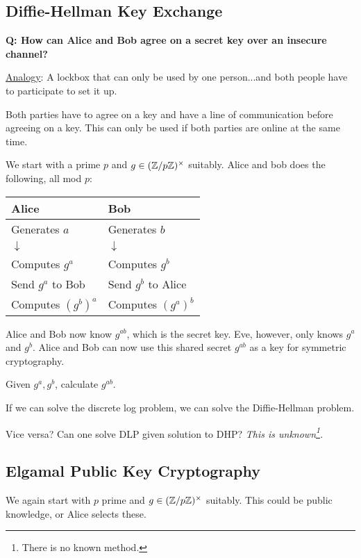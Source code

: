 \subsection{Diffie-Hellman Key Exchange}
\textbf{Q: How can Alice and Bob agree on a secret key over an insecure channel?}

\begin{example}
    \ul{Analogy}: A lockbox that can only be used by one person...and both people have to participate to set it up.
\end{example}

Both parties have to agree on a key and have a line of communication before agreeing on a key. This can only be used if both parties are online at the same time.

We start with a prime $p$ and $g\in(\mathbb Z/p\mathbb Z)^\times$ suitably. Alice and bob does the following, all mod $p$:
\begin{center}
    \begin{tabular}{ll}
        \toprule
        Alice              & Bob                 \\ \midrule
        Generates $a$      & Generates $b$       \\
        \quad $\downarrow$ & \quad $\downarrow$  \\
        Computes $g^a$     & Computes $g^b$      \\
        Send $g^a$ to Bob  & Send $g^b$ to Alice \\
        Computes $(g^b)^a$ & Computes $(g^a)^b$  \\
        \bottomrule
    \end{tabular}
\end{center}

Alice and Bob now know $g^{ab}$, which is the secret key. Eve, however, only knows $g^a$ and $g^b$. Alice and Bob can now use this shared secret $g^{ab}$ as a key for symmetric cryptography.

\begin{definition}
    Given $g^a, g^b$, calculate $g^{ab}$.
\end{definition}
\begin{remark}
    If we can solve the discrete log problem, we can solve the Diffie-Hellman problem.
\end{remark}

Vice versa? Can one solve DLP given solution to DHP? \emph{This is unknown\footnote{There is no known method.}.}

\subsection{Elgamal Public Key Cryptography}
We again start with $p$ prime and $g\in (\mathbb Z/p\mathbb Z)^\times$ suitably. This could be public knowledge, or Alice selects these.

